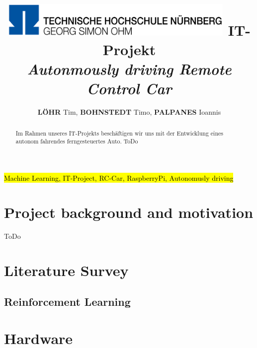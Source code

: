 \documentclass[journal]{IEEEtran}
\begin{document}
	
    \title{    
    \includegraphics[width=4.5in]{photo/logo.png}
    \newline \newline
     IT-Projekt \\ 
     \textit{Autonmously driving Remote Control Car}
     }

  \author{
      \textbf{L\"OHR} Tim,
      \textbf{BOHNSTEDT} Timo, 
      \textbf{PALPANES} Ioannis
}



\maketitle
\begin{abstract}
Im Rahmen unseres IT-Projekts beschäftigen wir uns mit der Entwicklung eines autonom fahrendes ferngesteuertes Auto. 
ToDo
\end{abstract}

\begin{IEEEkeywords}
\hl{Machine Learning, IT-Project, RC-Car, RaspberryPi, Autonomusly driving}
\end{IEEEkeywords}
\IEEEpeerreviewmaketitle

\section{Project background and motivation}
ToDo

\section{Literature Survey}
\label{sec:LiteratureSurvey}
\subsection{Reinforcement Learning}

\section{Hardware}
\end{document}
